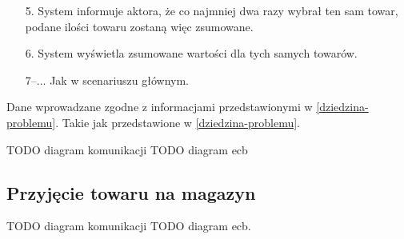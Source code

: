 \begin{usecase}
{\begin{enumerate}
       \item[5.] System informuje aktora, że co najmniej dwa razy wybrał ten sam towar, podane ilości towaru zostaną więc zsumowane.
       \item[6.] System wyświetla zsumowane wartości dla tych samych towarów.
       \item[7--...] Jak w scenariuszu głównym.
       \end{enumerate}
  }
   {
    Dane wprowadzane zgodne z informacjami przedstawionymi w \ref{dziedzina-problemu}.
  }
   {
    Takie jak przedstawione w \ref{dziedzina-problemu}.
  }
\end{usecase}
TODO diagram komunikacji TODO diagram ecb
\subsection{Przyjęcie towaru na magazyn}
\begin{usecase}
\end{usecase}
TODO diagram komunikacji
TODO diagram ecb.
